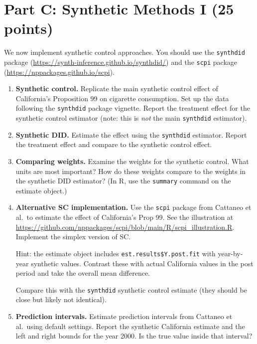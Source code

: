 \documentclass[11pt]{article}
\begin{document}
\section*{Part C: Synthetic Methods I (25 points)}

We now implement synthetic control approaches. You should use the \texttt{synthdid} package (\url{https://synth-inference.github.io/synthdid/}) and the \texttt{scpi} package (\url{https://nppackages.github.io/scpi}).

\begin{enumerate}[resume]

    \item \textbf{Synthetic control.} Replicate the main synthetic control effect of California's Proposition 99 on cigarette consumption. Set up the data following the \texttt{synthdid} package vignette. Report the treatment effect for the synthetic control estimator (note: this is \emph{not} the main \texttt{synthdid} estimator).


    \item \textbf{Synthetic DID.} Estimate the effect using the \texttt{synthdid} estimator. Report the treatment effect and compare to the synthetic control effect.


    \item \textbf{Comparing weights.} Examine the weights for the synthetic control. What units are most important? How do these weights compare to the weights in the synthetic DID estimator? (In R, use the \texttt{summary} command on the estimate object.)

    \item \textbf{Alternative SC implementation.} Use the \texttt{scpi} package from Cattaneo et al.\ to estimate the effect of California's Prop 99. See the illustration at \url{https://github.com/nppackages/scpi/blob/main/R/scpi_illustration.R}. Implement the simplex version of SC.

    Hint: the estimate object includes \texttt{est.results\$Y.post.fit} with year-by-year synthetic values. Contrast these with actual California values in the post period and take the overall mean difference.

    Compare this with the \texttt{synthdid} synthetic control estimate (they should be close but likely not identical).


    \item \textbf{Prediction intervals.} Estimate prediction intervals from Cattaneo et al.\ using default settings. Report the synthetic California estimate and the left and right bounds for the year 2000. Is the true value inside that interval?



\end{enumerate}
\end{document}
